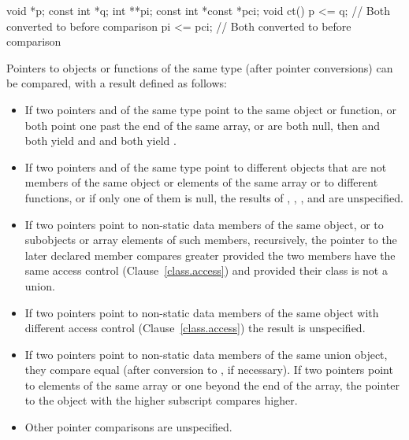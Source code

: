 \begin{codeblock}
void *p;
const int *q;
int **pi;
const int *const *pci;
void ct() {
  p <= q;           // Both converted to  before comparison
  pi <= pci;        // Both converted to  before comparison
}
\end{codeblock}
\exitexample 
{}%
%
Pointers to objects or functions of the same type (after pointer
conversions) can be compared, with a result defined as follows:

\begin{itemize}
\item If two pointers  and  of the same type point to
the same object or function, or both point one past the end of the same
array, or are both null, then  and  both yield
 and  and  both yield .

\item If two pointers  and  of the same type point to
different objects that are not members of the same object or elements of
the same array or to different functions, or if only one of them is
null, the results of , , , and
 are unspecified.

\item If two pointers point to non-static data members of the same
object, or to subobjects or array elements of such members, recursively,
the pointer to the later declared member compares greater provided the
two members
have the same access control (Clause~\ref{class.access})
and provided their class is not a union.

%
\item If two pointers point to non-static data members of the same
object
with different access control (Clause~\ref{class.access})
the result is unspecified.

\item If two pointers point to non-static data members of the same union object,
they compare equal (after conversion to , if necessary). If
two pointers point to elements of the same array or one beyond the end
of the array, the pointer to the object with the higher subscript
compares higher.

%
%
\item Other pointer comparisons are unspecified.
\end{itemize}

